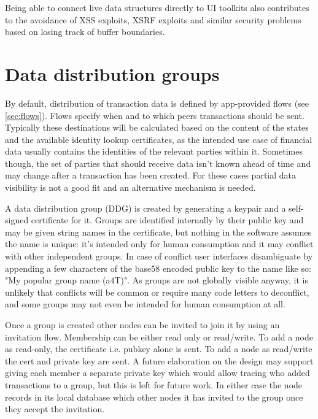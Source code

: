 \documentclass{article}
\begin{document}
Being able to connect live data structures directly to UI toolkits also contributes to the avoidance
of XSS exploits, XSRF exploits and similar security problems based on losing track of buffer boundaries.

\section{Data distribution groups}

By default, distribution of transaction data is defined by app-provided flows (see \cref{sec:flows}). Flows specify
when and to which peers transactions should be sent. Typically these destinations will be calculated based on the content
of the states and the available identity lookup certificates, as the intended use case of financial data usually
contains the identities of the relevant parties within it. Sometimes though, the set of parties that should receive
data isn't known ahead of time and may change after a transaction has been created. For these cases partial data
visibility is not a good fit and an alternative mechanism is needed.

A data distribution group (DDG) is created by generating a keypair and a self-signed certificate for it. Groups are
identified internally by their public key and may be given string names in the certificate, but nothing in the
software assumes the name is unique: it's intended only for human consumption and it may conflict with other independent
groups. In case of conflict user interfaces disambiguate by appending a few characters of the base58 encoded public key
to the name like so:  "My popular group name (a4T)". As groups are not globally visible anyway, it is unlikely that
conflicts will be common or require many code letters to deconflict, and some groups may not even be intended for
human consumption at all.

Once a group is created other nodes can be invited to join it by using an invitation flow. Membership can be either
read only or read/write. To add a node as read-only, the certificate i.e. pubkey alone is sent. To add a node as
read/write the cert and private key are sent. A future elaboration on the design may support giving each member a
separate private key which would allow tracing who added transactions to a group, but this is left for future work.
In either case the node records in its local database which other nodes it has invited to the group once they accept
the invitation.
\end{document}
